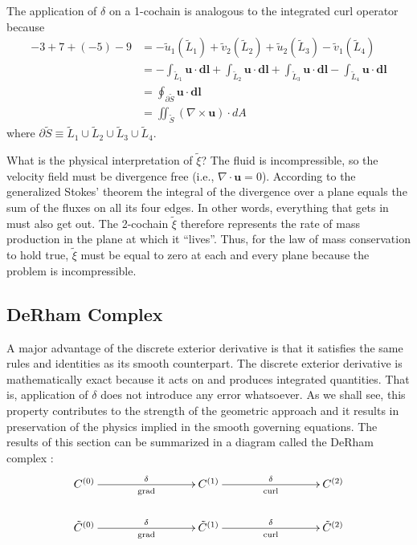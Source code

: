 The application of $\delta$ on a 1-cochain is analogous to the integrated curl operator because
\begin{equation}
    \begin{split}
        -3 + 7 + (-5) - 9 &= -\tilde{u}_1(\tilde{L}_1) + \tilde{v}_2(\tilde{L}_2) + \tilde{u}_2(\tilde{L}_3) - \tilde{v}_1(\tilde{L}_4) \\
        &= -\int_{\tilde{L}_1} \mathbf{u} \cdot \mathbf{dl} + \int_{\tilde{L}_2} \mathbf{u} \cdot \mathbf{dl} + \int_{\tilde{L}_3} \mathbf{u} \cdot \mathbf{dl} - \int_{\tilde{L}_4} \mathbf{u} \cdot \mathbf{dl} \\
        &= \oint_{\partial \tilde{S}} \mathbf{u} \cdot \mathbf{dl} \\
        &= \iint_{\tilde{S}} \left( \nabla \times \mathbf{u} \right) \cdot dA
    \end{split}
    \label{eq:curlExample}
\end{equation}
where $\partial \tilde{S} \equiv \tilde{L}_1 \cup \tilde{L}_2 \cup \tilde{L}_3 \cup \tilde{L}_4$. 

What is the physical interpretation of $\tilde{\xi}$? The fluid is incompressible, so the velocity field must be divergence free (i.e., $\nabla \cdot \mathbf{u} = 0$). According to the generalized Stokes' theorem the integral of the divergence over a plane equals the sum of the fluxes on all its four edges. In other words, everything that gets in must also get out. The 2-cochain $\tilde{\xi}$ therefore represents the rate of mass production in the plane at which it ``lives''. Thus, for the law of mass conservation to hold true, $\tilde{\xi}$ must be equal to zero at each and every plane because the problem is incompressible.

\subsection{DeRham Complex}

A major advantage of the discrete exterior derivative is that it satisfies the same rules and identities as its smooth counterpart. The discrete exterior derivative is mathematically exact because it acts on and produces integrated quantities. That is, application of $\delta$ does not introduce any error whatsoever. As we shall see, this property contributes to the strength of the geometric approach and it results in preservation of the physics implied in the smooth governing equations. The results of this section can be summarized in a diagram called the DeRham complex \parencite{gerritsma2014computational}:
\begin{equation}
    \begin{gathered}
        \xymatrix@C=20ex{
            C^{(0)} \ar[r]^{\delta}_{\text{grad}} & C^{(1)} \ar[r]^{\delta}_{\text{curl}} & C^{(2)} \\
            \tilde{C}^{(0)} \ar[r]^{\delta}_{\text{grad}} & \tilde{C}^{(1)} \ar[r]^{\delta}_{\text{curl}} & \tilde{C}^{(2)}
        }
    \end{gathered}
\end{equation}

